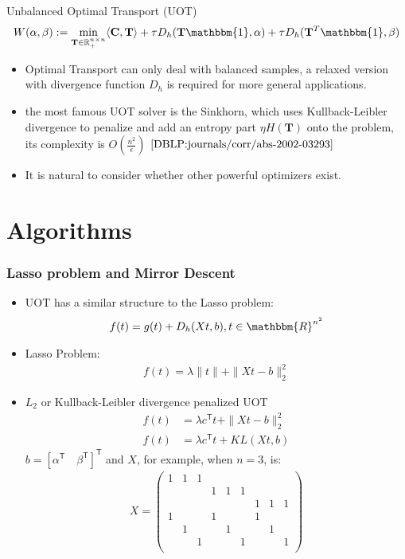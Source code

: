 \documentclass[dvipdfmx,cjk,t,10pt]{beamer}
\newcommand{\C}{\mathbf C}
\newcommand{\tranT}{\mathsf T}
\begin{document}
\begin{frame}
	\begin{screen}{Unbalanced Optimal Transport (UOT)}
$$
W(\alpha,\beta) := \min_{ \mathbf{T} \in \mathbb{R}_{+}^{n \times n}} \langle \C, \mathbf{T} \rangle + \tau D_h(\mathbf{T} \mathbbm{1},\alpha)+\tau D_h( \mathbf{T}^{T}\mathbbm{1},\beta)
$$

\end{screen}
	
	\begin{itemize}
	\item Optimal Transport can only deal with balanced samples, a relaxed version with divergence function $D_h$ is required for more general applications.
	\item the most famous UOT solver is the Sinkhorn, which uses Kullback-Leibler divergence to penalize and add an entropy part $\eta H(\mathbf{T})$ onto the problem, its complexity is $O(\frac{n^2}{\epsilon})$ $\cite{DBLP:journals/corr/abs-2002-03293}$
	\item It is natural to consider whether other powerful optimizers exist.
	\end{itemize}
\end{frame}


\section{Algorithms}
\begin{frame}
\frametitle{Lasso problem and Mirror Descent }
	
	\begin{itemize}
	\item UOT has a similar structure to the Lasso problem:
$$
\begin{aligned}
f(t) = g(t) + D_h(Xt,b), t\in \mathbbm{R}^{n^2}
\end{aligned}
$$
\item Lasso Problem:
$$
\begin{aligned}
f(t) = \lambda\|t\| + \|Xt-b\|_2^2
\end{aligned}
$$
\item $L_2$ or Kullback-Leibler divergence penalized UOT
$$
\begin{aligned}
f(t) &= \lambda c^{\tranT}t + \|Xt-b\|_2^2\\
f(t) &= \lambda c^{\tranT}t + KL(Xt,b)
\end{aligned}
$$
$b=[\alpha^{\tranT} \quad \beta^{\tranT}]^{\tranT}$ and $X$, for example, when $n=3$, is:
\begin{align}
 X= 
\begin{pmatrix}
1&1&1& & & & & &\\
 & & &1&1&1& & &\\
 & & & & & &1&1&1\\
1& & &1& & &1& &\\
 &1& & &1& & &1&\\
 & &1& & &1& & &1\\
\end{pmatrix}
\end{align}	
\end{itemize}
\end{frame}
\end{document}
